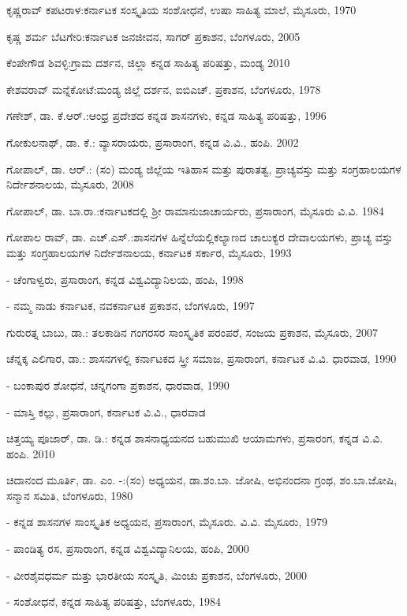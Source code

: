\noindent
ಕೃಷ್ಣರಾವ್​ ಕಪಟರಾಳ:ಕರ್ನಾಟಕ ಸಂಸ್ಕೃತಿಯ ಸಂಶೋಧನೆ, ಉಷಾ ಸಾಹಿತ್ಯ ಮಾಲೆ, ಮೈಸೂರು, 1970

\noindent
ಕೃಷ್ಣ ಶರ್ಮ ಬೆಟಗೇರಿ:ಕರ್ನಾಟಕ ಜನಜೀವನ, ಸಾಗರ್​ ಪ್ರಕಾಶನ, ಬೆಂಗಳೂರು, 2005

\noindent
ಕೆಂಪೇಗೌಡ ಶಿವಳ್ಳಿ:ಗ್ರಾಮ ದರ್ಶನ, ಜಿಲ್ಲಾ ಕನ್ನಡ ಸಾಹಿತ್ಯ ಪರಿಷತ್ತು, ಮಂಡ್ಯ 2010

\noindent
ಕೇಶವರಾವ್​ ಮನ್ನೆಕೋಟೆ:ಮಂಡ್ಯ ಜಿಲ್ಲೆ ದರ್ಶನ, ಐಬಿಎಚ್​. ಪ್ರಕಾಶನ, ಬೆಂಗಳೂರು, 1978

\noindent
ಗಣೇಶ್​, ಡಾ. ಕೆ.ಆರ್​.:ಆಂಧ್ರ ಪ್ರದೇಶದ ಕನ್ನಡ ಶಾಸನಗಳು, ಕನ್ನಡ ಸಾಹಿತ್ಯ ಪರಿಷತ್ತು, 1996

\noindent
ಗೋಕುಲನಾಥ್​, ಡಾ. ಕೆ.: ವ್ಯಾಸರಾಯರು, ಪ್ರಸಾರಾಂಗ, ಕನ್ನಡ ವಿ.ವಿ., ಹಂಪಿ. 2002

\noindent
ಗೋಪಾಲ್​, ಡಾ. ಆರ್​.: (ಸಂ) ಮಂಡ್ಯ ಜಿಲ್ಲೆಯ ಇತಿಹಾಸ ಮತ್ತು ಪುರಾತತ್ವ, ಪ್ರಾಚ್ಯವಸ್ತು ಮತ್ತು ಸಂಗ್ರಹಾಲಯಗಳ ನಿರ್ದೇಶನಾಲಯ, ಮೈಸೂರು, 2008

\noindent
ಗೋಪಾಲ್​, ಡಾ. ಬಾ.ರಾ.:ಕರ್ನಾಟಕದಲ್ಲಿ ಶ‍್ರೀ ರಾಮಾನುಜಾಚಾರ್ಯರು, ಪ್ರಸಾರಾಂಗ, ಮೈಸೂರು ವಿ.ವಿ. 1984

\noindent
ಗೋಪಾಲ ರಾವ್​, ಡಾ. ಎಚ್​.ಎಸ್​.:ಶಾಸನಗಳ ಹಿನ್ನೆಲೆಯಲ್ಲಿಕಲ್ಯಾಣದ ಚಾಲುಕ್ಯರ ದೇವಾಲಯಗಳು, ಪ್ರಾಚ್ಯ ವಸ್ತು ಮತ್ತು ಸಂಗ್ರಹಾಲಯಗಳ ನಿರ್ದೇಶನಾಲಯ, ಕರ್ನಾಟಕ ಸರ್ಕಾರ, ಮೈಸೂರು, 1993

- ಚೆಂಗಾಳ್ವರು, ಪ್ರಸಾರಾಂಗ, ಕನ್ನಡ ವಿಶ್ವವಿದ್ಯಾನಿಲಯ, ಹಂಪಿ, 1998

- ನಮ್ಮ ನಾಡು ಕರ್ನಾಟಕ, ನವಕರ್ನಾಟಕ ಪ್ರಕಾಶನ, ಬೆಂಗಳೂರು, 1997

\noindent
ಗುರುರತ್ನ ಬಾಬು, ಡಾ.: ತಲಕಾಡಿನ ಗಂಗರಸರ ಸಾಂಸ್ಕೃತಿಕ ಪರಂಪರೆ, ಸಂಜಯ ಪ್ರಕಾಶನ, ಮೈಸೂರು, 2007

\noindent
ಚೆನ್ನಕ್ಕ ಎಲಿಗಾರ, ಡಾ.: ಶಾಸನಗಳಲ್ಲಿ ಕರ್ನಾಟಕದ ಸ್ತ್ರೀ ಸಮಾಜ, ಪ್ರಸಾರಾಂಗ, ಕರ್ನಾಟಕ ವಿ.ವಿ. ಧಾರವಾಡ, 1990

- ಬಂಕಾಪುರ ಶೋಧನೆ, ಚನ್ನಗಂಗಾ ಪ್ರಕಾಶನ, ಧಾರವಾಡ, 1990

- ಮಾಸ್ತಿ ಕಲ್ಲು, ಪ್ರಸಾರಾಂಗ, ಕರ್ನಾಟಕ ವಿ.ವಿ., ಧಾರವಾಡ

\noindent
ಚಿತ್ತಯ್ಯ ಪೂಜಾರ್​, ಡಾ. ಡಿ.: ಕನ್ನಡ ಶಾಸನಾಧ್ಯಯನದ ಬಹುಮುಖಿ ಆಯಾಮಗಳು, ಪ್ರಸಾರಂಗ, ಕನ್ನಡ ವಿ.ವಿ. ಹಂಪಿ. 2010

\noindent
ಚಿದಾನಂದ ಮೂರ್ತಿ, ಡಾ. ಎಂ. -:(ಸಂ) ಅಧ್ಯಯನ, ಡಾ.ಶಂ.ಬಾ. ಜೋಷಿ, ಅಭಿನಂದನಾ ಗ್ರಂಥ, ಶಂ.ಬಾ.ಜೋಷಿ, ಸನ್ಮಾನ ಸಮಿತಿ, ಬೆಂಗಳೂರು, 1980

- ಕನ್ನಡ ಶಾಸನಗಳ ಸಾಂಸ್ಕೃತಿಕ ಅಧ್ಯಯನ, ಪ್ರಸಾರಾಂಗ, ಮೈಸೂರು. ವಿ.ವಿ. ಮೈಸೂರು, 1979

- ಪಾಂಡಿತ್ಯ ರಸ, ಪ್ರಸಾರಾಂಗ, ಕನ್ನಡ ವಿಶ್ವವಿದ್ಯಾನಿಲಯ, ಹಂಪಿ, 2000

- ವೀರಶೈವಧರ್ಮ ಮತ್ತು ಭಾರತೀಯ ಸಂಸ್ಕೃತಿ, ಮಿಂಚು ಪ್ರಕಾಶನ, ಬೆಂಗಳೂರು, 2000

- ಸಂಶೋಧನೆ, ಕನ್ನಡ ಸಾಹಿತ್ಯ ಪರಿಷತ್ತು, ಬೆಂಗಳೂರು, 1984


